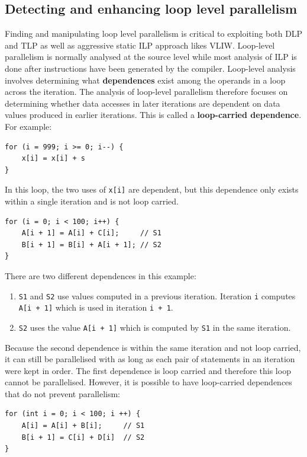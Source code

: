 \documentclass[11pt]{article}
\begin{document}
\subsection{Detecting and enhancing loop level parallelism}
Finding and manipulating loop level parallelism is critical to exploiting both DLP and TLP as well as aggressive static ILP approach likes VLIW. Loop-level parallelism is normally analysed at the source level while most analysis of ILP is done after instructions have been generated by the compiler. Loop-level analysis involves determining what \textbf{dependences} exist among the operands in a loop across the iteration. 
\n
The analysis of loop-level parallelism therefore focuses on determining whether data accesses in later iterations are dependent on data values produced in earlier iterations. This is called a \textbf{loop-carried dependence}. For example: \\
\begin{lstlisting}[caption={Example of a parallel loop}, captionpos=b]
for (i = 999; i >= 0; i--) {
	x[i] = x[i] + s
}
\end{lstlisting}
\noindent
In this loop, the two uses of \texttt{x[i]} are dependent, but this dependence only exists within a single iteration and is not loop carried.
\\
\begin{lstlisting}[caption={Example of a loop with loop-carried dependences}, captionpos=b]
for (i = 0; i < 100; i++) {
	A[i + 1] = A[i] + C[i]; 	// S1
	B[i + 1] = B[i] + A[i + 1]; // S2
}
\end{lstlisting}
\noindent
There are two different dependences in this example:
\begin{enumerate}
\item \texttt{S1} and \texttt{S2} use values computed in a previous iteration. Iteration \texttt{i} computes \texttt{A[i + 1]} which is used in iteration \texttt{i + 1}.
\item \texttt{S2} uses the value \texttt{A[i + 1]} which is computed by \texttt{S1} in the same iteration.  
\end{enumerate}
Because the second dependence is within the same iteration and not loop carried, it can still be parallelised with as long as each pair of statements in an iteration were kept in order. The first dependence is loop carried and therefore this loop cannot be parallelised. 
\n
However, it is possible to have loop-carried dependences that do not prevent parallelism:
\begin{lstlisting}
for (int i = 0; i < 100; i ++) {
	A[i] = A[i] + B[i];		// S1
	B[i + 1] = C[i] + D[i] 	// S2
}
\end{lstlisting}
\end{document}
